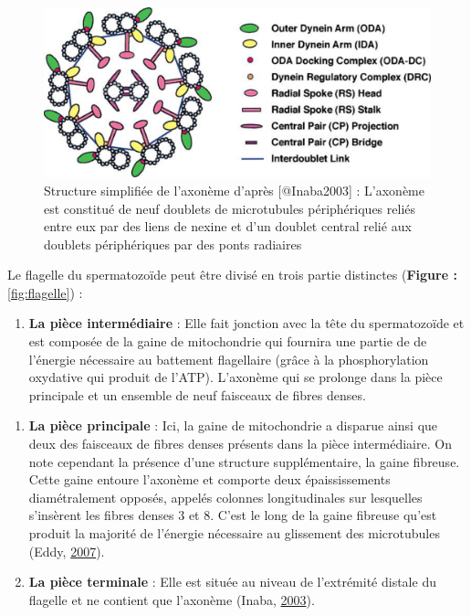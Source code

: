 \documentclass[12pt,twoside]{reedthesis}
\providecommand{\tightlist}{%
  \setlength{\itemsep}{0pt}\setlength{\parskip}{0pt}}
\theoremstyle{definition}
\theoremstyle{definition}
\theoremstyle{remark}
\begin{document}
  \begin{figure}
  
  {\centering \includegraphics[scale=.3]{figure/axoneme} 
  
  }
  
  \caption[Structure simplifiée de l'axonème]{Structure simplifiée de l'axonème d'après [@Inaba2003] : L'axonème est constitué de neuf doublets de microtubules périphériques reliés entre eux par des liens de nexine et d'un doublet central relié aux doublets périphériques par des ponts radiaires}\label{fig:axoneme}
  \end{figure}
  
  Le flagelle du spermatozoïde peut être divisé en trois partie distinctes
  (\textbf{Figure : }\ref{fig:flagelle}) :
  
  \begin{enumerate}
  \def\labelenumi{\arabic{enumi}.}
  \tightlist
  \item
    \textbf{La pièce intermédiaire} : Elle fait jonction avec la tête du
    spermatozoïde et est composée de la gaine de mitochondrie qui fournira
    une partie de de l'énergie nécessaire au battement flagellaire (grâce
    à la phosphorylation oxydative qui produit de l'ATP). L'axonème qui se
    prolonge dans la pièce principale et un ensemble de neuf faisceaux de
    fibres denses.
  \end{enumerate}
  
  \newpage
  
  \begin{enumerate}
  \def\labelenumi{\arabic{enumi}.}
  \setcounter{enumi}{1}
  \tightlist
  \item
    \textbf{La pièce principale} : Ici, la gaine de mitochondrie a
    disparue ainsi que deux des faisceaux de fibres denses présents dans
    la pièce intermédiaire. On note cependant la présence d'une structure
    supplémentaire, la gaine fibreuse. Cette gaine entoure l'axonème et
    comporte deux épaississements diamétralement opposés, appelés colonnes
    longitudinales sur lesquelles s'insèrent les fibres denses 3 et 8.
    C'est le long de la gaine fibreuse qu'est produit la majorité de
    l'énergie nécessaire au glissement des microtubules (Eddy,
    \protect\hyperlink{ref-Eddy2007}{2007}).\\
  \item
    \textbf{La pièce terminale} : Elle est située au niveau de l'extrémité
    distale du flagelle et ne contient que l'axonème (Inaba,
    \protect\hyperlink{ref-Inaba2003}{2003}).
  \end{enumerate}
  
\end{document}
